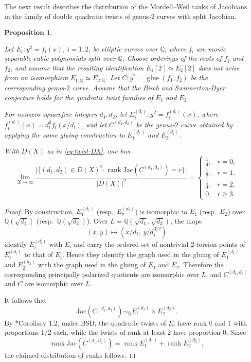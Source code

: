 \documentclass{amsart}
\newcommand{\Q}{{\mathbb Q}}
\newcommand{\Jac}{\mathrm{Jac}}
\DeclareMathOperator{\rank}{\mathrm{rank}}
\newtheorem{proposition}{Proposition}[section]
\begin{document}
The next result describes the distribution of the Mordell–Weil ranks of Jacobians in the family of double quadratic twists of genus-$2$ curves with split Jacobian.

\begin{proposition} \label{split twist}

Let \(E_i:y^2=f_i(x)\), \(i=1,2\), be elliptic curves over
\(\mathbb Q\), where \(f_i\) are monic separable cubic polynomials split over
\(\mathbb Q\). Choose orderings of the roots of \(f_1\) and \(f_2\), and assume
that the resulting identification \(E_1[2]\simeq E_2[2]\) does not arise from an isomorphism $E_{1, \overline{\mathbb Q}} \simeq E_{2, \overline{\mathbb Q}}$. Let
\(C:y^2=\operatorname{glue}(f_1,f_2)\) be the corresponding genus-\(2\) curve.
Assume that the Birch and Swinnerton-Dyer conjecture holds for the quadratic
twist families of \(E_1\) and \(E_2\).

For nonzero squarefree integers \(d_1,d_2\), let
\(E_i^{(d_i)}:y^2=f_i^{(d_i)}(x)\), where
\(f_i^{(d_i)}(x)=d_i^3 f_i(x/d_i)\), and let
\(C^{(d_1,d_2)}\) be the genus-\(2\) curve obtained by applying the same gluing
construction to \(E_1^{(d_1)}\) and \(E_2^{(d_2)}\).

With \(D(X)\) as in \eqref{eq:twist-DX}, one has
\[
\lim_{X\to\infty}
\frac{\bigl|\{(d_1,d_2)\in D(X)^2 :
\rank\Jac(C^{(d_1,d_2)})=r\}\bigr|}
{|D(X)|^2}
=
\begin{cases}
\frac{1}{4}, & r=0,\\[4pt]
\frac{1}{2}, & r=1,\\[4pt]
\frac{1}{4}, & r=2,\\[4pt]
0,           & r\ge 3.
\end{cases}
\]
\end{proposition}


\begin{proof}
By construction, $E_1^{(d_1)}$ (resp.~$E_2^{(d_2)}$) is isomorphic to
$E_1$ (resp.~$E_2$) over $\Q(\sqrt{d_1})$ (resp.~$\Q(\sqrt{d_2})$). Over \(L=\mathbb Q(\sqrt{d_1},\sqrt{d_2})\), the maps
\[
(x,y)\mapsto (x/d_i,\; y/d_i^{3/2})
\]
identify \(E_i^{(d_i)}\) with \(E_i\) and carry the ordered set of nontrivial
\(2\)-torsion points of \(E_i^{(d_i)}\) to that of \(E_i\). Hence they identify
the graph used in the gluing of \(E_1^{(d_1)}\) and \(E_2^{(d_2)}\) with the
graph used in the gluing of \(E_1\) and \(E_2\). Therefore the corresponding
principally polarized quotients are isomorphic over \(L\), and  \(C^{(d_1,d_2)}\) and \(C\) are isomorphic over \(L\).

 It follows that
\[
\Jac(C^{(d_1,d_2)}) \sim_{\Q} E_1^{(d_1)} \times E_2^{(d_2)}.
\]
By \cite{Smith2025}*{Corollary 1.2}, under BSD, the quadratic twists of \(E_i\) have rank
\(0\) and \(1\) with proportions \(1/2\) each, while the twists of rank at least
\(2\) have proportion \(0\). Since
\[
\rank \Jac(C^{(d_1,d_2)}) =
\rank E_1^{(d_1)} + \rank E_2^{(d_2)},
\]
the claimed distribution of ranks follows.
\end{proof}
\end{document}
